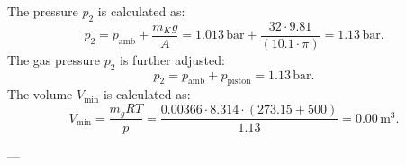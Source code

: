 The pressure \( p_2 \) is calculated as:  
\[
p_2 = p_{\text{amb}} + \frac{m_K g}{A} = 1.013 \, \text{bar} + \frac{32 \cdot 9.81}{(10.1 \cdot \pi)} = 1.13 \, \text{bar}.
\]  
The gas pressure \( p_2 \) is further adjusted:  
\[
p_2 = p_{\text{amb}} + p_{\text{piston}} = 1.13 \, \text{bar}.
\]  
The volume \( V_{\text{min}} \) is calculated as:  
\[
V_{\text{min}} = \frac{m_g R T}{p} = \frac{0.00366 \cdot 8.314 \cdot (273.15 + 500)}{1.13} = 0.00 \, \text{m}^3.
\]  

---